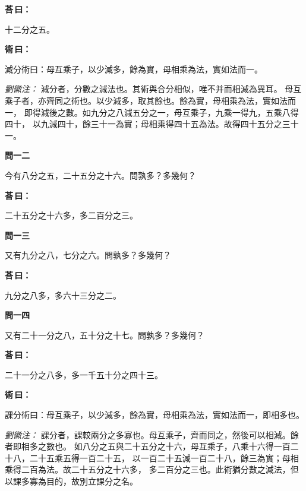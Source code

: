 \documentclass[11pt,a4paper]{article}
\newenvironment{problem}[1][]{%
  \par\vspace{0.6em}\noindent\textcolor{problemcolor}{\textbf{問\ignorespaces#1\unskip}\hspace{0.5em}}%
  \ignorespaces
}{\par\vspace{0.4em}}
\newenvironment{answer}{%
  \par\noindent\textcolor{answercolor}{\textbf{荅\,曰：}}%
  \ignorespaces
}{\par\vspace{0.3em}}
\newenvironment{method}{%
  \par\noindent\textcolor{methodcolor}{\textbf{術\,曰：}}%
  \ignorespaces
}{\par\vspace{0.4em}}
\newenvironment{liuhuicomm}{%
  \par\vspace{0.3em}\noindent\textcolor{commentarycolor}{\small\textit{劉徽注：}}}%
  {\par\vspace{0.5em}}
\begin{document}
\begin{answer}
十二分之五。
\end{answer}

\begin{method}
減分術曰：母互乘子，以少減多，餘為實，母相乘為法，實如法而一。
\end{method}

\begin{liuhuicomm}
減分者，分數之減法也。其術與合分相似，唯不并而相減為異耳。
母互乘子者，亦齊同之術也。以少減多，取其餘也。餘為實，母相乘為法，實如法而一，
即得減後之數。如九分之八減五分之一，母互乘子，九乘一得九，五乘八得四十，
以九減四十，餘三十一為實；母相乘得四十五為法。故得四十五分之三十一。
\end{liuhuicomm}

\begin{problem}[一二]
今有八分之五，二十五分之十六。問孰多？多幾何？
\end{problem}

\begin{answer}
二十五分之十六多，多二百分之三。
\end{answer}

\begin{problem}[一三]
又有九分之八，七分之六。問孰多？多幾何？
\end{problem}

\begin{answer}
九分之八多，多六十三分之二。
\end{answer}

\begin{problem}[一四]
又有二十一分之八，五十分之十七。問孰多？多幾何？
\end{problem}

\begin{answer}
二十一分之八多，多一千五十分之四十三。
\end{answer}

\begin{method}
課分術曰：母互乘子，以少減多，餘為實，母相乘為法，實如法而一，即相多也。
\end{method}

\begin{liuhuicomm}
課分者，課較兩分之多寡也。母互乘子，齊而同之，然後可以相減。餘者即相多之數也。
如八分之五與二十五分之十六，母互乘子，八乘十六得一百二十八，二十五乘五得一百二十五，
以一百二十五減一百二十八，餘三為實；母相乘得二百為法。故二十五分之十六多，
多二百分之三也。此術猶分數之減法，但以課多寡為目的，故別立課分之名。
\end{liuhuicomm}
\end{document}
